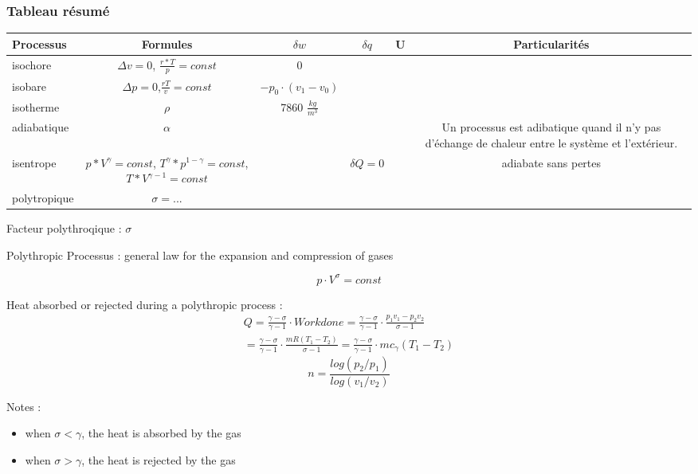 	\subsubsection{Tableau résumé}
	\begin{tabular}{|l|c|c|c|c|c|}
		\hline
		Processus & Formules & $\delta w$ & $\delta q$ & U & Particularités \\ \hline
		isochore & $\Delta v=0$, $\frac{r*T}{p}=const$ & 0 & & & \\ \hline
		isobare & $\Delta p=0$,$\frac{rT}{v}=const$ & $-p_0 \cdot (v_1-v_0)$ & & & \\ \hline
		isotherme & $\rho$ & 7860 $\frac{kg}{m^3}$ & & &\\ \hline
		adiabatique & $\alpha$ & & & & Un processus est adibatique quand il n'y pas d'échange de chaleur entre le système et l'extérieur. \\ \hline
		isentrope & $p*V^\gamma=const$, $T^\gamma*p^{1-\gamma}=const$, $
		T*V^{\gamma-1}=const$ & & $\delta Q=0$ & & adiabate sans pertes \\ \hline
		polytropique & $\sigma=...$ & & & & \\ \hline
	\end{tabular}
	\medbreak
	Facteur polythroqique : $\sigma$
	
	Polythropic Processus : general law for the expansion and compression of gases
	
	\begin{equation}
	p \cdot V^{\sigma}=const
	\end{equation}
	
	Heat absorbed or rejected during a polythropic process :
	\begin{equation}
	\begin{split}
	Q=\frac{\gamma - \sigma}{\gamma - 1} \cdot Workdone = \frac{\gamma - \sigma}{\gamma - 1} \cdot \frac{p_1 v_1 - p_2 v_2}{\sigma-1}\\= 
	\frac{\gamma - \sigma}{\gamma - 1} \cdot \frac{m R (T_1 -T_2)}{\sigma-1}=\frac{\gamma - \sigma}{\gamma - 1} \cdot m c_{\gamma} (T_1 -T_2)
	\end{split}
	\end{equation}
	\begin{equation}
	n = \frac{log(p_2/p_1)}{log(v_1/v_2)}
	\end{equation}
	
	Notes :
	\begin{itemize}
		\item when $\sigma < \gamma$, the heat is absorbed by the gas
		\item when $\sigma > \gamma$, the heat is rejected by the gas
	\end{itemize}
	
